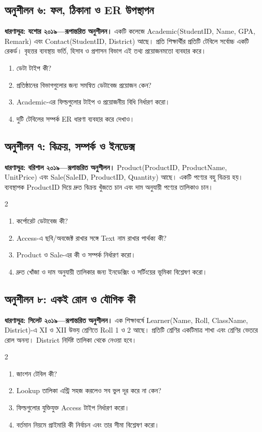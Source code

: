 \subsection{অনুশীলন ৬: ফল, ঠিকানা ও ER উপস্থাপন}
\textbf{ধারণাসূত্র: যশোর ২০১৯—রূপান্তরিত অনুশীলন।}
একটি কলেজে Academic(StudentID, Name, GPA, Remark) এবং Contact(StudentID, District) আছে। প্রতি শিক্ষার্থীর প্রতিটি টেবিলে সর্বোচ্চ একটি রেকর্ড। বৃহত্তর ব্যবস্থায় ভর্তি, হিসাব ও প্রশাসন বিভাগ এই তথ্য প্রয়োজনমতো ব্যবহার করে।
\begin{enumerate}
\item[ক.] ডেটা টাইপ কী?
\item[খ.] প্রতিষ্ঠানের বিভাগগুলোর জন্য সমন্বিত ডেটাবেজ প্রয়োজন কেন?
\item[গ.] Academic-এর ফিল্ডগুলোর টাইপ ও প্রয়োজনীয় বিধি নির্ধারণ করো।
\item[ঘ.] দুটি টেবিলের সম্পর্ক ER ধারণা ব্যবহার করে দেখাও।
\end{enumerate}
\subsection{অনুশীলন ৭: বিক্রয়, সম্পর্ক ও ইনডেক্স}
\textbf{ধারণাসূত্র: বরিশাল ২০১৯—রূপান্তরিত অনুশীলন।}
Product(ProductID, ProductName, UnitPrice) এবং Sale(SaleID, ProductID, Quantity) আছে। একটি পণ্যের বহু বিক্রয় হয়। ব্যবস্থাপক ProductID দিয়ে দ্রুত বিক্রয় খুঁজতে চান এবং দাম অনুযায়ী পণ্যের তালিকাও চান।
\begin{multicols}{2}
\small
\begin{enumerate}
\item[ক.] কর্পোরেট ডেটাবেজ কী?
\item[খ.] Access-এ ছবি/অবজেক্ট রাখার সঙ্গে Text নাম রাখার পার্থক্য কী?
\item[গ.] Product ও Sale-এর কী ও সম্পর্ক নির্ধারণ করো।
\item[ঘ.] দ্রুত খোঁজা ও দাম অনুযায়ী তালিকার জন্য ইনডেক্সিং ও সর্টিংয়ের ভূমিকা বিশ্লেষণ করো।
\end{enumerate}
\small

\end{multicols}


\subsection{অনুশীলন ৮: একই রোল ও যৌগিক কী}
\textbf{ধারণাসূত্র: সিলেট ২০১৯—রূপান্তরিত অনুশীলন।}
এক শিক্ষাবর্ষে Learner(Name, Roll, ClassName, District)-এ XI ও XII উভয় শ্রেণিতে Roll 1 ও 2 আছে। প্রতিটি শ্রেণির একটিমাত্র শাখা এবং শ্রেণির ভেতরে রোল অনন্য। District নির্দিষ্ট তালিকা থেকে নেওয়া হবে।
\begin{multicols}{2}
\small
\begin{enumerate}
\item[ক.] জাংশন টেবিল কী?
\item[খ.] Lookup তালিকা এন্ট্রি সহজ করলেও সব ভুল দূর করে না কেন?
\item[গ.] ফিল্ডগুলোর যুক্তিযুক্ত Access টাইপ নির্ধারণ করো।
\item[ঘ.] বর্তমান নিয়মে প্রাইমারি কী নির্বাচন এবং তার সীমা বিশ্লেষণ করো।
\end{enumerate}
\small

\end{multicols}


